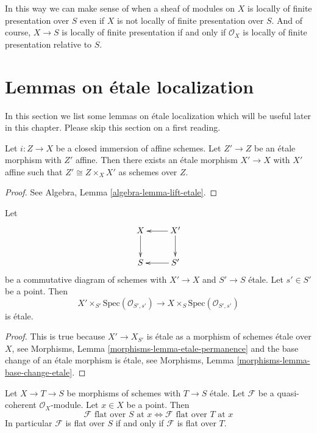 \noindent
In this way we can make sense of when a sheaf of modules on $X$ is
locally of finite presentation over $S$ even if $X$ is not locally
of finite presentation over $S$. And of course, $X \to S$ is locally
of finite presentation if and only if $\mathcal{O}_X$ is locally
of finite presentation relative to $S$.


\section{Lemmas on \'etale localization}
\label{section-etale-localization}

\noindent
In this section we list some lemmas on \'etale localization which will be
useful later in this chapter. Please skip this section on a first reading.

\begin{lemma}
\label{lemma-lift-etale}
Let $i : Z \to X$ be a closed immersion of affine schemes.
Let $Z' \to Z$ be an \'etale morphism with $Z'$ affine.
Then there exists an \'etale morphism $X' \to X$ with $X'$
affine such that $Z' \cong Z \times_X X'$ as schemes over $Z$.
\end{lemma}

\begin{proof}
See
Algebra, Lemma \ref{algebra-lemma-lift-etale}.
\end{proof}

\begin{lemma}
\label{lemma-etale-at-point}
Let
$$
\xymatrix{
X \ar[d] & X' \ar[l] \ar[d] \\
S & S' \ar[l]
}
$$
be a commutative diagram of schemes with $X' \to X$ and $S' \to S$ \'etale.
Let $s' \in S'$ be a point. Then
$$
X' \times_{S'} \text{Spec}(\mathcal{O}_{S', s'})
\longrightarrow
X \times_S \text{Spec}(\mathcal{O}_{S', s'})
$$
is \'etale.
\end{lemma}

\begin{proof}
This is true because $X' \to X_{S'}$ is \'etale as a morphism of
schemes \'etale over $X$, see
Morphisms, Lemma \ref{morphisms-lemma-etale-permanence}
and the base change of an \'etale morphism is \'etale, see
Morphisms, Lemma \ref{morphisms-lemma-base-change-etale}.
\end{proof}

\begin{lemma}
\label{lemma-etale-flat-up-down}
Let $X \to T \to S$ be morphisms of schemes with $T \to S$ \'etale.
Let $\mathcal{F}$ be a quasi-coherent $\mathcal{O}_X$-module.
Let $x \in X$ be a point. Then
$$
\mathcal{F}\text{ flat over }S\text{ at }x
\Leftrightarrow
\mathcal{F}\text{ flat over }T\text{ at }x
$$
In particular $\mathcal{F}$ is flat over $S$ if and only if $\mathcal{F}$
is flat over $T$.
\end{lemma}

